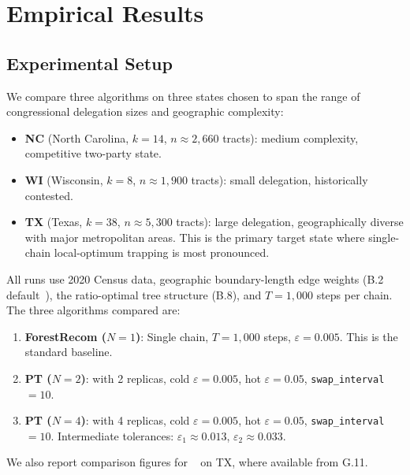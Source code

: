\section{Empirical Results}
\label{sec:empirical}

\subsection{Experimental Setup}

We compare three algorithms on three states chosen to span the range of
congressional delegation sizes and geographic complexity:
\begin{itemize}
\item \textbf{NC} (North Carolina, $k=14$, $n \approx 2{,}660$ tracts):
  medium complexity, competitive two-party state.
\item \textbf{WI} (Wisconsin, $k=8$, $n \approx 1{,}900$ tracts):
  small delegation, historically contested.
\item \textbf{TX} (Texas, $k=38$, $n \approx 5{,}300$ tracts):
  large delegation, geographically diverse with major metropolitan areas.
  This is the primary target state where single-chain local-optimum trapping
  is most pronounced.
\end{itemize}

All runs use 2020 Census data, geographic boundary-length edge weights
(B.2 default~\citep{b2paper}), the \geosec{} ratio-optimal tree structure (B.8),
and $T=1{,}000$ steps per chain.
The three algorithms compared are:

\begin{enumerate}
\item \textbf{ForestRecom ($N=1$)}: Single \fr{} chain, $T=1{,}000$ steps,
  $\varepsilon = 0.005$.
  This is the standard baseline.
\item \textbf{PT ($N=2$)}: \pt{} with 2 replicas, cold $\varepsilon=0.005$,
  hot $\varepsilon=0.05$, \texttt{swap\_interval}$=10$.
\item \textbf{PT ($N=4$)}: \pt{} with 4 replicas, cold $\varepsilon=0.005$,
  hot $\varepsilon=0.05$, \texttt{swap\_interval}$=10$.
  Intermediate tolerances: $\varepsilon_1 \approx 0.013$, $\varepsilon_2 \approx 0.033$.
\end{enumerate}

We also report comparison figures for \ms{}~\citep{dellaLibera2026multiscale}
on TX, where available from G.11.

